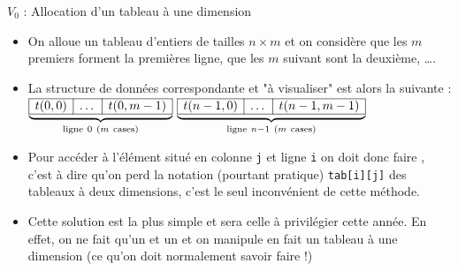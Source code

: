 \documentclass[10pt]{beamer}
\begin{document}
\begin{frame}[fragile]{\Ctitle}{\stitle}
	\begin{block}{$V_0$ : Allocation d'un tableau à une dimension}
		\begin{itemize}
			\item<1-> On alloue un tableau d'entiers de tailles $n \times m$ et on considère que les $m$ premiers forment la premières ligne, que les $m$ suivant sont la deuxième, \dots.
			\item<2-> La structure de données correspondante et "à visualiser" est alors la suivante : \\
				$\underbrace{\begin{array}{|c|c|c|} \hline t(0,0)& \dots & t(0,m-1)\\ \hline \end{array}}_{\mathrm{ligne\ }0 \ (m \mathrm{\ cases})}$
				\dotfill
				$\underbrace{\begin{array}{|c|c|c|} \hline t(n-1,0)& \dots & t(n-1,m-1)\\ \hline \end{array}}_{\mathrm{ligne\ }n-1 \ (m \mathrm{\ cases})}$
			\item<3-> Pour accéder à l'élément situé en colonne {\tt j} et ligne {\tt i} on doit donc faire , c'est à dire qu'on perd la notation (pourtant pratique) {\tt tab[i][j]} des tableaux à deux dimensions, c'est le seul inconvénient de cette méthode. 
			\item<4-> \textcolor{BrickRed}{Cette solution est la plus simple et sera celle à privilégier cette année}. En effet, on ne fait qu'un  et un  et on manipule en fait un tableau à une dimension (ce qu'on doit normalement savoir faire !)
		\end{itemize}
	\end{block}
\end{frame}
\end{document}
